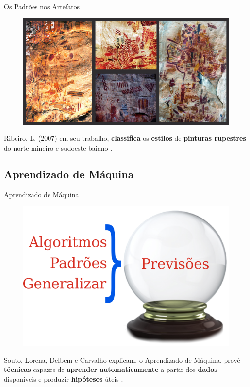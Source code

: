     \begin{frame}[fragile]{Os Padrões nos Artefatos}
        \begin{figure}[H]
        \begin{center}
            \includegraphics[scale=0.60]{images/arte_rupestre.png}
        \end{center}
        \end{figure}

        Ribeiro, L. (2007) em seu trabalho, \textbf{classifica} os 
        \textbf{estilos} de \textbf{pinturas rupestres} do norte mineiro e 
        sudoeste baiano \cite{ribeiro2007repensando}.
    \end{frame}

\subsection{Aprendizado de Máquina}
    \begin{frame}[fragile]{Aprendizado de Máquina}
        \begin{figure}[H]
        \begin{center}
            \includegraphics[scale=0.50]{images/previsao.png}
        \end{center}
        \end{figure}

        Souto, Lorena, Delbem e Carvalho explicam, o Aprendizado de Máquina,
        provê \textbf{técnicas} capazes de \textbf{aprender automaticamente} a 
        partir dos \textbf{dados} disponíveis e produzir \textbf{hipóteses} 
        úteis \cite{de2003tecnicas}.

  \end{frame}

